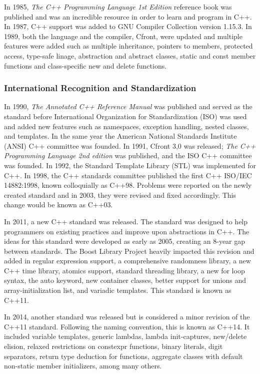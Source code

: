 \documentclass[12pt]{article}
\begin{document}
In 1985, \textit{The C++ Programming Language 1st Edition} reference book was published and was an incredible resource in order to learn and program in C++. In 1987, C++ support was added to GNU Compiler Collection version 1.15.3. In 1989, both the language and the compiler, Cfront, were updated and multiple features were added such as multiple inheritance, pointers to members, protected access, type-safe linage, abstraction and abstract classes, static and const member functions and class-specific new and delete functions. 

\subsubsection{International Recognition and Standardization}
In 1990, \textit{The Annotated C++ Reference Manual} was published and served as the standard before International Organization for Standardization (ISO) was used and added new features such as namespaces, exception handling, nested classes, and templates. In the same year the American National Standards Institute (ANSI) C++ committee was founded. In 1991, Cfront 3,0 was released; \textit{The C++ Programming Language 2nd edition} was published, and the ISO C++ committee was founded. In 1992, the Standard Template Library (STL) was implemented for C++. In 1998, the C++ standards committee published the first C++ ISO/IEC 14882:1998, known colloquially as C++98. Problems were reported on the newly created standard and in 2003, they were revised and fixed accordingly. This change would be known as C++03.

In 2011, a new C++ standard was released. The standard was designed to help programmers on existing practices and improve upon abstractions in C++. The ideas for this standard were developed as early as 2005, creating an 8-year gap between standards. The Boost Library Project heavily impacted this revision and added in regular expression support, a comprehensive randomness library, a new C++ time library, atomics support, standard threading library, a new for loop syntax, the auto keyword, new container classes, better support for unions and array-initialization list, and variadic templates. This standard is known as C++11.

In 2014, another standard was released but is considered a minor revision of the C++11 standard. Following the naming convention, this is known as C++14. It included variable templates, generic lambdas, lambda init-captures, new/delete elision, relaxed restrictions on constexpr functions, binary literals, digit separators, return type deduction for functions, aggregate classes with default non-static member initializers, among many others.
\end{document}
